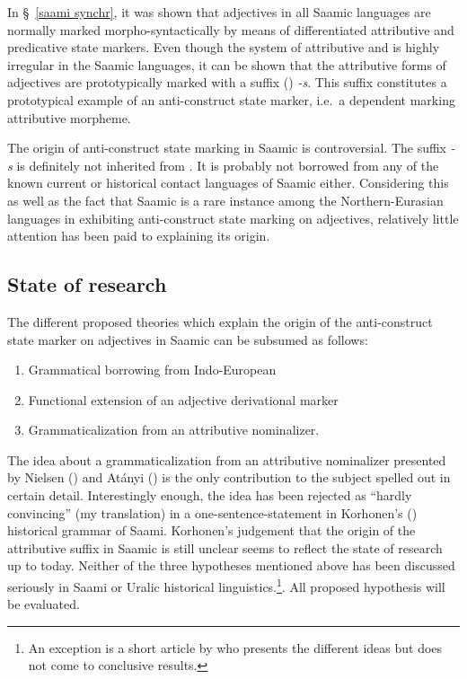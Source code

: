 {In \S~\ref{saami synchr}, it was shown that adjectives in all Saamic languages are normally marked morpho-syntactically by means of differentiated attributive and predicative state markers. Even though the system of attributive and  is highly irregular in the Saamic languages, it can be shown that the attributive forms of adjectives are prototypically marked with a suffix () \textit{-s}. This suffix constitutes a prototypical example of an anti\hyp{}construct state marker, i.e.~a dependent marking attributive morpheme.

The origin of anti\hyp{}construct state marking in Saamic is controversial. The suffix \textit{-s} is definitely not inherited from . It is probably not borrowed from any of the known current or historical contact languages of Saamic either. Considering this as well as the fact that Saamic is a rare instance among the Northern-Eurasian languages in exhibiting anti\hyp{}construct state marking on adjectives, relatively little attention has been paid to explaining its origin.

\subsection{State of research}
The different proposed theories which explain the origin of the anti\hyp{}construct state marker on adjectives in Saamic can be subsumed as follows:
\begin{enumerate}
\item Grammatical borrowing from Indo-European
\item Functional extension of an adjective derivational marker
\item Grammaticalization from an attributive nominalizer.
\end{enumerate}
The idea about a grammaticalization from an attributive nominalizer presented by Nielsen (\citeyear{nielsen1933}) and Atányi (\citeyear{atanyi1942,atanyi1943}) is the only contribution to the subject spelled out in certain detail. Interestingly enough, the idea has been rejected as “hardly convincing” (my translation) in a one-sentence-statement in Korhonen's (\citeyear{korhonen-m1981}) historical grammar of Saami. Korhonen's judgement that the origin of the attributive suffix in Saamic is still unclear \cite[246]{korhonen-m1981} seems to reflect the state of research up to today. Neither of the three hypotheses mentioned above has been discussed seriously in Saami or Uralic historical linguistics.\footnote{An exception is a short article by \cite{sarv-m2001} who presents the different ideas but does not come to conclusive results.}. All proposed hypothesis will be evaluated.

}
